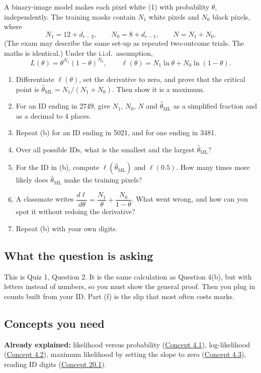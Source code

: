 \documentclass[12pt,a4paper]{article}
\begin{document}
A binary-image model makes each pixel white (1) with probability $\theta$, independently. The training masks contain $N_1$ white pixels and $N_0$ black pixels, where
\[
N_1=12+d_{r-2},\qquad N_0=8+d_{r-1},\qquad N=N_1+N_0 .
\]
(The exam may describe the same set-up as repeated two-outcome trials. The maths is identical.) Under the i.i.d.\ assumption,
\[
L(\theta)=\theta^{N_1}(1-\theta)^{N_0},\qquad \ell(\theta)=N_1\ln\theta+N_0\ln(1-\theta).
\]
\begin{enumerate}[label=(\alph*)]
  \item Differentiate $\ell(\theta)$, set the derivative to zero, and prove that the critical point is $\hat\theta_{\text{ML}}=N_1/(N_1+N_0)$. Then show it is a maximum.
  \item For an ID ending in 2749, give $N_1$, $N_0$, $N$ and $\hat\theta_{\text{ML}}$ as a simplified fraction and as a decimal to 4 places.
  \item Repeat (b) for an ID ending in 5021, and for one ending in 3481.
  \item Over all possible IDs, what is the smallest and the largest $\hat\theta_{\text{ML}}$?
  \item For the ID in (b), compute $\ell(\hat\theta_{\text{ML}})$ and $\ell(0.5)$. How many times more likely does $\hat\theta_{\text{ML}}$ make the training pixels?
  \item A classmate writes $\dfrac{d\ell}{d\theta}=\dfrac{N_1}{\theta}+\dfrac{N_0}{1-\theta}$. What went wrong, and how can you spot it without redoing the derivative?
  \item Repeat (b) with your own digits.
\end{enumerate}

\subsection{What the question is asking}

This is Quiz 1, Question 2. It is the same calculation as Question 4(b), but with letters instead of numbers, so you must show the general proof. Then you plug in counts built from your ID. Part (f) is the slip that most often costs marks.

\subsection{Concepts you need}

\textbf{Already explained:} likelihood versus probability (\hyperref[c4-1]{Concept 4.1}), log-likelihood (\hyperref[c4-2]{Concept 4.2}), maximum likelihood by setting the slope to zero (\hyperref[c4-3]{Concept 4.3}), reading ID digits (\hyperref[c20-1]{Concept 20.1}).
\end{document}
